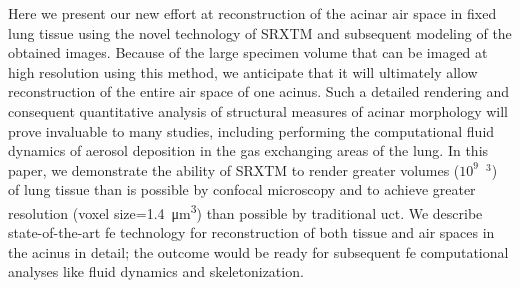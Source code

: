 Here we present our new effort at \threed reconstruction of the acinar air space in fixed lung tissue using the novel technology of \ac{SRXTM} and subsequent \threed modeling of the obtained images. Because of the large specimen volume that can be imaged at high resolution using this method, we anticipate that it will ultimately allow \threed reconstruction of the entire air space of one acinus. Such a detailed rendering and consequent \threed quantitative analysis of structural measures of acinar morphology will prove invaluable to many studies, including performing the computational fluid dynamics of aerosol deposition in the gas exchanging areas of the lung. In this paper, we demonstrate the ability of \ac{SRXTM} to render greater volumes ($10^9$~\micro\meter$^3$) of lung tissue than is possible by confocal microscopy and to achieve greater resolution (voxel size=\SI{1.4}{\micro\meter\cubed}) than possible by traditional \ac{uct}. We describe state-of-the-art \acf{fe} technology for \threed reconstruction of both tissue and air spaces in the acinus in detail; the outcome would be ready for subsequent \ac{fe} computational analyses like fluid dynamics and skeletonization.

